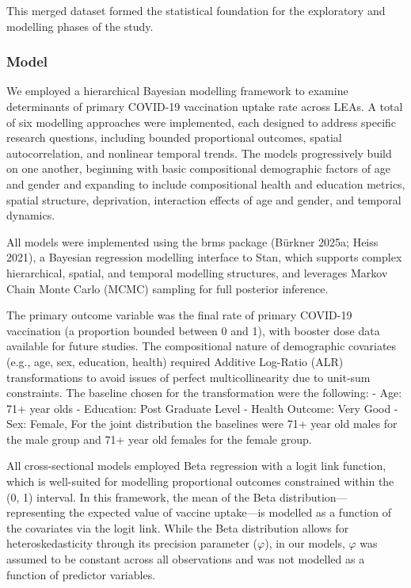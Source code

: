 \documentclass{article}
\begin{document}
This merged dataset formed the statistical foundation for the
exploratory and modelling phases of the study.

\subsubsection{Model}\label{model}

We employed a hierarchical Bayesian modelling framework to examine
determinants of primary COVID-19 vaccination uptake rate across LEAs. A
total of six modelling approaches were implemented, each designed to
address specific research questions, including bounded proportional
outcomes, spatial autocorrelation, and nonlinear temporal trends. The
models progressively build on one another, beginning with basic
compositional demographic factors of age and gender and expanding to
include compositional health and education metrics, spatial structure,
deprivation, interaction effects of age and gender, and temporal
dynamics.

All models were implemented using the brms package (Bürkner 2025a; Heiss
2021), a Bayesian regression modelling interface to Stan, which supports
complex hierarchical, spatial, and temporal modelling structures, and
leverages Markov Chain Monte Carlo (MCMC) sampling for full posterior
inference.

The primary outcome variable was the final rate of primary COVID-19
vaccination (a proportion bounded between 0 and 1), with booster dose
data available for future studies. The compositional nature of
demographic covariates (e.g., age, sex, education, health) required
Additive Log-Ratio (ALR) transformations to avoid issues of perfect
multicollinearity due to unit-sum constraints. The baseline chosen for
the transformation were the following: - Age: 71+ year olds - Education:
Post Graduate Level - Health Outcome: Very Good - Sex: Female, For the
joint distribution the baselines were 71+ year old males for the male
group and 71+ year old females for the female group.

All cross-sectional models employed Beta regression with a logit link
function, which is well-suited for modelling proportional outcomes
constrained within the (0, 1) interval. In this framework, the mean of
the Beta distribution---representing the expected value of vaccine
uptake---is modelled as a function of the covariates via the logit link.
While the Beta distribution allows for heteroskedasticity through its
precision parameter (\(\varphi\)), in our models, \(\varphi\) was
assumed to be constant across all observations and was not modelled as a
function of predictor variables.
\end{document}
